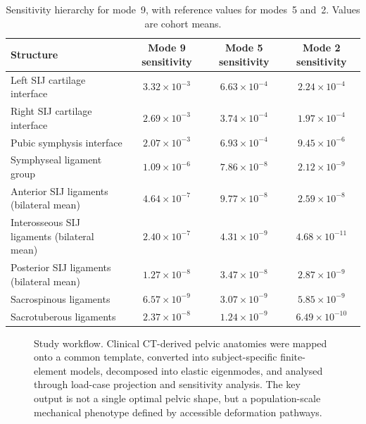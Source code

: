\documentclass[openacc]{rsproca_new}
\begin{document}
\begin{table}[p]
\centering
\caption{Sensitivity hierarchy for mode~9, with reference values for modes~5 and~2. Values are cohort means.}
\label{tab:sensitivity}
\begin{tabular}{lccc}
\toprule
Structure & Mode 9 sensitivity & Mode 5 sensitivity & Mode 2 sensitivity \\
\midrule
Left SIJ cartilage interface & $3.32 \times 10^{-3}$ & $6.63 \times 10^{-4}$ & $2.24 \times 10^{-4}$ \\
Right SIJ cartilage interface & $2.69 \times 10^{-3}$ & $3.74 \times 10^{-4}$ & $1.97 \times 10^{-4}$ \\
Pubic symphysis interface & $2.07 \times 10^{-3}$ & $6.93 \times 10^{-4}$ & $9.45 \times 10^{-6}$ \\
Symphyseal ligament group & $1.09 \times 10^{-6}$ & $7.86 \times 10^{-8}$ & $2.12 \times 10^{-9}$ \\
Anterior SIJ ligaments (bilateral mean) & $4.64 \times 10^{-7}$ & $9.77 \times 10^{-8}$ & $2.59 \times 10^{-8}$ \\
Interosseous SIJ ligaments (bilateral mean) & $2.40 \times 10^{-7}$ & $4.31 \times 10^{-9}$ & $4.68 \times 10^{-11}$ \\
Posterior SIJ ligaments (bilateral mean) & $1.27 \times 10^{-8}$ & $3.47 \times 10^{-8}$ & $2.87 \times 10^{-9}$ \\
Sacrospinous ligaments & $6.57 \times 10^{-9}$ & $3.07 \times 10^{-9}$ & $5.85 \times 10^{-9}$ \\
Sacrotuberous ligaments & $2.37 \times 10^{-8}$ & $1.24 \times 10^{-9}$ & $6.49 \times 10^{-10}$ \\
\bottomrule
\end{tabular}
\end{table}

\begin{figure}[p]
\centering
{}
\caption{Study workflow. Clinical CT-derived pelvic anatomies were mapped onto a common template, converted into subject-specific finite-element models, decomposed into elastic eigenmodes, and analysed through load-case projection and sensitivity analysis. The key output is not a single optimal pelvic shape, but a population-scale mechanical phenotype defined by accessible deformation pathways.}
\label{fig:workflow}
\end{figure}
\end{document}
